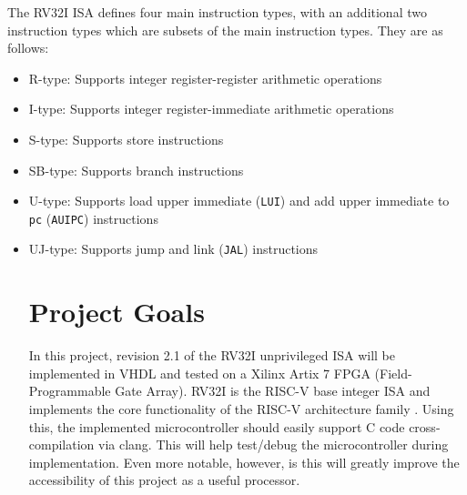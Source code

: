 \documentclass[lettersize,journal]{IEEEtran}
\begin{document}
The RV32I ISA defines four main instruction types, with an additional two instruction types which are subsets of the main instruction types. They are as follows:
\begin{itemize}
  \item R-type: Supports integer register-register arithmetic operations
  \item I-type: Supports integer register-immediate arithmetic operations
  \item S-type: Supports store instructions
  \item SB-type: Supports branch instructions
  \item U-type: Supports load upper immediate (\verb|LUI|) and add upper immediate to \verb|pc| (\verb|AUIPC|) instructions
  \item UJ-type: Supports jump and link (\verb|JAL|) instructions
\section{Project Goals}


In this project, revision 2.1 of the RV32I unprivileged ISA will be implemented in VHDL and tested on a Xilinx Artix 7 FPGA (Field-Programmable Gate Array). 
RV32I is the RISC-V base integer ISA and implements the core functionality of the RISC-V architecture family \cite{riscvunprovisioned}.
Using this, the implemented microcontroller should easily support C code cross-compilation via clang.
This will help test/debug the microcontroller during implementation.
Even more notable, however, is this will greatly improve the accessibility of this project as a useful processor.


\end{itemize}
\end{document}
